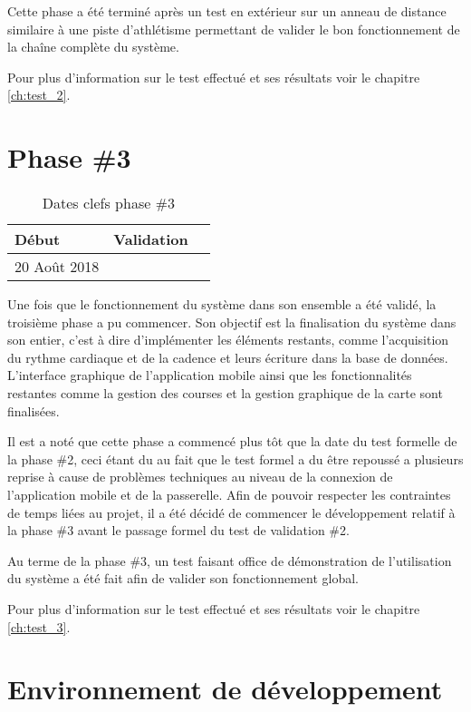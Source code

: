 Cette phase a été terminé après un test en extérieur sur un anneau de distance similaire à une piste d'athlétisme permettant de valider le bon fonctionnement de la chaîne complète du système.

Pour plus d'information sur le test effectué et ses résultats voir le chapitre \ref{ch:test_2}.

\section{Phase \#3}

\begin{table}[htb]
\caption{Dates clefs phase \#3}
\label{tab:detail_phase_3}
\centering
\begin{tabular}{ l l l }
\toprule
Début & Validation \\
\midrule
20 Août 2018 & \todo{}  \\
\bottomrule 
\end{tabular}
\end{table}

Une fois que le fonctionnement du système dans son ensemble a été validé, la troisième phase a pu commencer. Son objectif est la finalisation du système dans son entier, c'est à dire d'implémenter les éléments restants, comme l'acquisition du rythme cardiaque et de la cadence et leurs écriture dans la base de données. L'interface graphique de l'application mobile ainsi que les fonctionnalités restantes comme la gestion des courses et la gestion graphique de la carte sont finalisées.

Il est a noté que cette phase a commencé plus tôt que la date du test formelle de la phase \#2, ceci étant du au fait que le test formel a du être repoussé a plusieurs reprise à cause de problèmes techniques au niveau de la connexion de l'application mobile et de la passerelle. Afin de pouvoir respecter les contraintes de temps liées au projet, il a été décidé de commencer le développement relatif à la phase \#3 avant le passage formel du test de validation \#2.

Au terme de la phase \#3, un test faisant office de démonstration de l'utilisation du système a été fait afin de valider son fonctionnement global.

Pour plus d'information sur le test effectué et ses résultats voir le chapitre \ref{ch:test_3}.

\section{Environnement de développement}

\todo{}


